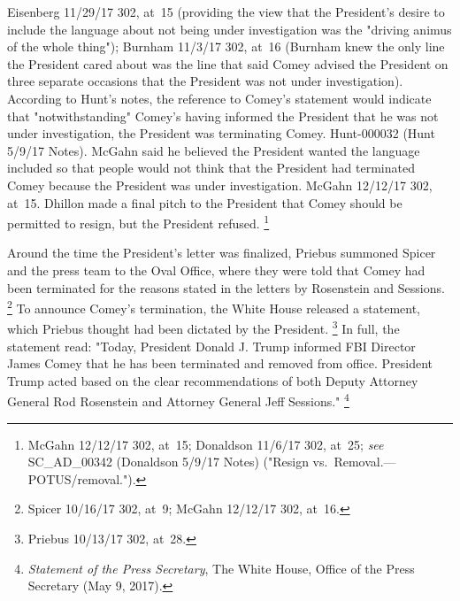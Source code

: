 {{Eisenberg 11/29/17 302, at~15 (providing the view that the President's desire to include the language about not being under investigation was the "driving animus of the whole thing");
Burnham 11/3/17 302, at~16 (Burnham knew the only line the President cared about was the line that said Comey advised the President on three separate occasions that the President was not under investigation).
According to Hunt's notes, the reference to Comey's statement would indicate that "notwithstanding" Comey's having informed the President that he was not under investigation, the President was terminating Comey.
Hunt-000032 (Hunt 5/9/17 Notes).
McGahn said he believed the President wanted the language included so that people would not think that the President had terminated Comey because the President was under investigation.
McGahn 12/12/17 302, at~15.}
Dhillon made a final pitch to the President that Comey should be permitted to resign, but the President refused.%
\footnote{McGahn 12/12/17 302, at~15;
Donaldson 11/6/17 302, at~25;
\textit{see} SC\_AD\_00342 (Donaldson 5/9/17 Notes) ("Resign vs.\ Removal.---POTUS/removal.").}

Around the time the President's letter was finalized, Priebus summoned Spicer and the press team to the Oval Office, where they were told that Comey had been terminated for the reasons stated in the letters by Rosenstein and Sessions.%
\footnote{Spicer 10/16/17 302, at~9;
McGahn 12/12/17 302, at~16.}
To announce Comey's termination, the White House released a statement, which Priebus thought had been dictated by the President.%
\footnote{Priebus 10/13/17 302, at~28.}
In full, the statement read: "Today, President Donald J. Trump informed FBI Director James Comey that he has been terminated and removed from office.
President Trump acted based on the clear recommendations of both Deputy Attorney General Rod Rosenstein and Attorney General Jeff Sessions."%
\footnote{\textit{Statement of the Press Secretary}, The White House, Office of the Press Secretary (May 9, 2017).}

}
